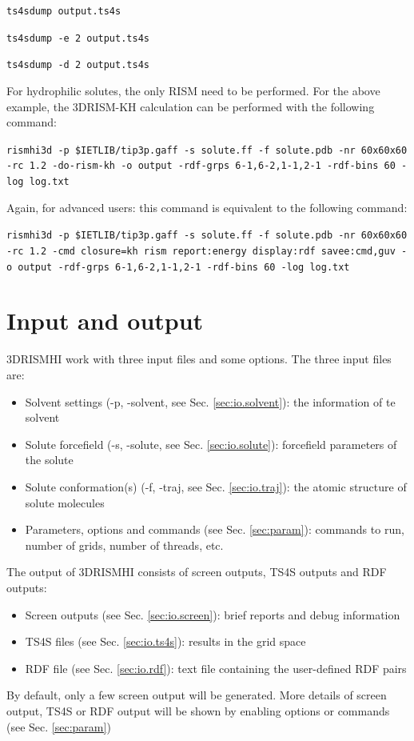 \documentclass[aip,amsmath,amssymb,reprint,onecolumn]{revtex4-1}
\begin{document}
\texttt{\color{blue}\small ts4sdump output.ts4s}

\texttt{\color{blue}\small ts4sdump -e 2 output.ts4s}

\texttt{\color{blue}\small ts4sdump -d 2 output.ts4s}

For hydrophilic solutes, the only RISM need to be performed. For the above example, the 3DRISM-KH calculation can be performed with the following command:

\texttt{\color{blue}\small rismhi3d -p \$IETLIB/tip3p.gaff -s solute.ff -f solute.pdb -nr 60x60x60 -rc 1.2 -do-rism-kh -o output -rdf-grps 6-1,6-2,1-1,2-1 -rdf-bins 60 -log log.txt}

{Again, for advanced users: this command is equivalent to the following command:

\texttt{\color{blue}\small rismhi3d -p \$IETLIB/tip3p.gaff -s solute.ff -f solute.pdb -nr 60x60x60 -rc 1.2 -cmd closure=kh rism report:energy display:rdf savee:cmd,guv -o output -rdf-grps 6-1,6-2,1-1,2-1 -rdf-bins 60 -log log.txt}
}


\section{Input and output}

3DRISMHI work with three input files and some options. The three input files are:
\begin{itemize}
  \item Solvent settings (-p, -solvent, see Sec. \ref{sec:io.solvent}): the information of te solvent
  \item Solute forcefield (-s, -solute, see Sec. \ref{sec:io.solute}): forcefield parameters of the solute
  \item Solute conformation(s) (-f, -traj, see Sec. \ref{sec:io.traj}): the atomic structure of solute molecules
  \item Parameters, options and commands (see Sec. \ref{sec:param}): commands to run, number of grids, number of threads, etc.
\end{itemize}

The output of 3DRISMHI consists of screen outputs, TS4S outputs and RDF outputs:
\begin{itemize}
  \item Screen outputs (see Sec. \ref{sec:io.screen}): brief reports and debug information
  \item TS4S files (see Sec. \ref{sec:io.ts4s}): results in the grid space
  \item RDF file (see Sec. \ref{sec:io.rdf}): text file containing the user-defined RDF pairs
\end{itemize}
By default, only a few screen output will be generated. More details of screen output, TS4S or RDF output will be shown by enabling options or commands (see Sec. \ref{sec:param})
\end{document}
